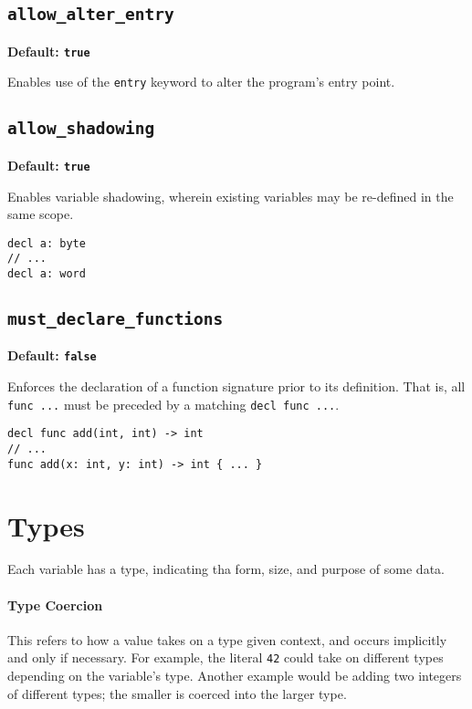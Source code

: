 \documentclass{article}
\begin{document}
\subsection{\texttt{allow\_alter\_entry}}

\textbf{Default: \texttt{true}}

Enables use of the \texttt{entry} keyword to alter the program's entry point.

\subsection{\texttt{allow\_shadowing}}

\textbf{Default: \texttt{true}}

Enables variable shadowing, wherein existing variables may be re-defined in the same scope.

\begin{lstlisting}[language=CustomLang]
decl a: byte
// ...
decl a: word
\end{lstlisting}

\subsection{\texttt{must\_declare\_functions}}

\textbf{Default: \texttt{false}}

Enforces the declaration of a function signature prior to its definition.
That is, all \texttt{func ...} must be preceded by a matching \texttt{decl func ...}.

\begin{lstlisting}[language=CustomLang]
decl func add(int, int) -> int
// ...
func add(x: int, y: int) -> int { ... }
\end{lstlisting}

\section{Types}

Each variable has a type, indicating tha form, size, and purpose of some data.

\paragraph*{Type Coercion}
This refers to how a value takes on a type given context, and occurs implicitly and only if necessary.
For example, the literal \texttt{42} could take on different types depending on the variable's type.
Another example would be adding two integers of different types; the smaller is coerced into the larger type.
\end{document}
